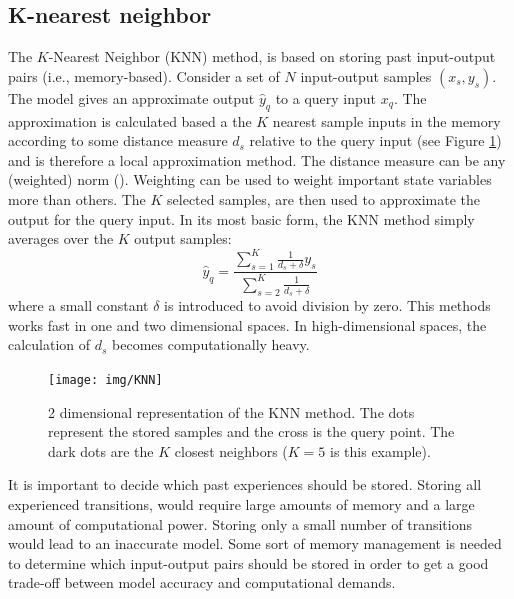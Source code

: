 \documentclass[a4paper,11pt]{mscLiterature}
\begin{document}
\subsection{K-nearest neighbor}
The $K$-Nearest Neighbor (KNN) method, is based on storing past input-output pairs (i.e., memory-based). Consider a set of $N$ input-output samples $(x_s,y_s)$. The model gives an approximate output $\hat{y}_q$ to a query input $x_q$. The approximation is calculated based a the $K$ nearest sample inputs in the memory according to some distance measure $d_s$ relative to the query input (see Figure \ref{fig:KNN}) and is therefore a local approximation method. The distance measure can be any (weighted) norm (\cite{Atkeson:97a}). Weighting can be used to weight important state variables more than others. The $K$ selected samples, are then used to approximate the output for the query input. In its most basic form, the KNN method simply averages over the $K$ output samples:
\begin{equation}
	\hat{y}_q = \frac{\sum_{s=1}^K {\frac{1}{d_s+\delta}}y_s}{\sum_{s=2}^K{\frac{1}{d_s+\delta}}}
\end{equation}
where a small constant $\delta$ is introduced to avoid division by zero. This methods works fast in one and two dimensional spaces. In high-dimensional spaces, the calculation of $d_s$ becomes computationally heavy.
\begin{figure}[htbp]
	\centering
		\texttt{[image: img/KNN]}
	\caption{2 dimensional representation of the KNN method. The dots represent the stored samples and the cross is the query point. The dark dots are the $K$ closest neighbors ($K=5$ is this example).}
	\label{fig:KNN}
\end{figure}
It is important to decide which past experiences should be stored. Storing all experienced transitions, would require large amounts of memory and a large amount of computational power. Storing only a small number of transitions would lead to an inaccurate model. Some sort of memory management is needed to determine which input-output pairs should be stored in order to get a good trade-off between model accuracy and computational demands.
 
 
\end{document}
